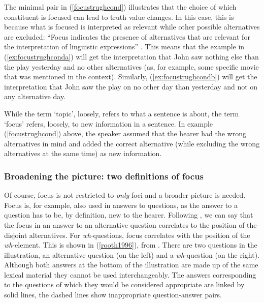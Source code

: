 \noindent The minimal pair in (\ref{focustrughcond}) illustrates that the choice of which constituent is focused can lead to truth value changes. In this case, this is because what is focused is interpreted as relevant while other possible alternatives are excluded: ``Focus indicates the presence of alternatives that are relevant for the interpretation of linguistic expressions'' \citep[18]{krifka2007basic}. This means that the example in (\ref{ex:focustrughconda}) will get the interpretation that John saw nothing else than the play yesterday and no other alternatives (as, for example, some specific movie that was mentioned in the context). Similarly, (\ref{ex:focustrughcondb}) will get the interpretation that John saw the play on no other day than yesterday and not on any alternative day.

While the term `topic', loosely, refers to what a sentence is about, the term `focus' refers, loosely, to new information in a sentence. In example (\ref{focustrughcond}) above, the speaker assumed that the hearer had the wrong alternatives in mind and added the correct alternative (while excluding the wrong alternatives at the same time) as new information.

\subsubsection{Broadening the picture: two definitions of focus}
Of course, focus is not restricted to \textit{only} foci and a broader picture is needed. Focus is, for example, also used in answers to questions, as the answer to a question has to be, by definition, new to the hearer. Following \citet{rooth1996focus}, we can say that the focus in an answer to an alternative question correlates to the position of the disjoint alternatives. For \textit{wh}-questions, focus correlates with the position of the \textit{wh}-element. This is shown in (\ref{rooth1996}), from \citet{rooth1996focus}. There are two questions in the illustration, an alternative question (on the left) and a \textit{wh}-question (on the right). Although both answers at the bottom of the illustration are made up of the same lexical material they cannot be used interchangeably. The answers corresponding to the questions of which they would be considered appropriate are linked by solid lines, the dashed lines show inappropriate question-answer pairs.

